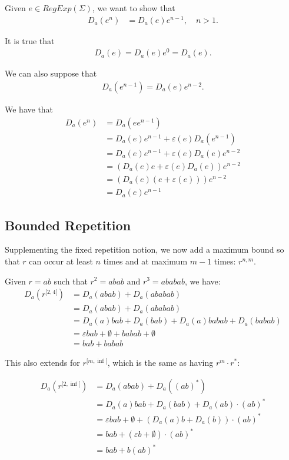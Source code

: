 \noindent Given $e \in RegExp(\Sigma)$, we want to show that
\begin{align*}
	D_a(e^n) &= D_a(e)e^{n-1}, \quad n>1.
\end{align*}

\noindent It is true that
\begin{align*}
	D_a(e) = D_a(e)e^0 = D_a(e). 
\end{align*}

\noindent We can also suppose that
\begin{align*}
	D_a(e^{n-1}) = D_a(e)e^{n-2}.
\end{align*}

\noindent We have that
\begin{align*}
	D_a(e^n) &= D_a(ee^{n-1}) \\
	&= D_a(e)e^{n-1} + \varepsilon(e)D_a(e^{n-1}) \\
	&= D_a(e)e^{n-1} + \varepsilon(e)D_a(e)e^{n-2} \\
	&= (D_a(e)e + \varepsilon(e)D_a(e))e^{n-2} \\
	&= (D_a(e)(e+\varepsilon(e)))e^{n-2} \\
	&= D_a(e)e^{n-1}
\end{align*}


\subsection{Bounded Repetition}
Supplementing the fixed repetition notion, we now add a maximum bound so that $r$ can occur at least $n$ times and at maximum $m-1$ times: $r^{n,m}$.

Given $r = ab$ such that $r^2 = abab$ and $r^3 = ababab$, we have:
\begin{align*}
	D_a(r^{[2,4[}) &= D_a(abab) + D_a(ababab) \\
	&= D_a(abab) + D_a(ababab) \\
	&= D_a(a)bab + D_a(bab) + D_a(a)babab + D_a(babab) \\
	&= \varepsilon bab + \emptyset + babab + \emptyset \\
	&= bab + babab
\end{align*}

This also extends for $r^{[m, \inf[}$, which is the same as having $r^m \cdot r^*$:

\begin{align*}
	D_a(r^{[2,\inf[}) &= D_a(abab) + D_a((ab)^*) \\
	&= D_a(a)bab + D_a(bab) + D_a(ab)\cdot(ab)^* \\
	&= \varepsilon bab + \emptyset + (D_a(a)b + D_a(b)) \cdot (ab)^* \\
	&= bab + (\varepsilon b + \emptyset) \cdot (ab)^* \\
	&= bab + b(ab)^*
\end{align*}

